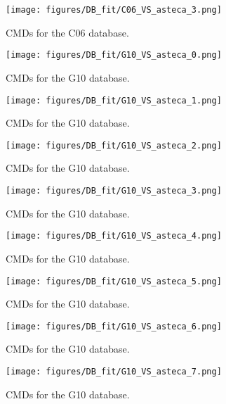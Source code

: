 \documentclass{aa}
\begin{document}
\begin{appendix}
\begin{figure}
\texttt{[image: figures/DB\_fit/C06\_VS\_asteca\_3.png]}
\caption{CMDs for the C06 database.}
\label{fig:DBs_C06_3}
\end{figure}
\clearpage

\begin{figure*}
\texttt{[image: figures/DB\_fit/G10\_VS\_asteca\_0.png]}
\caption{CMDs for the G10 database.}
\label{fig:DBs_G10_0}
\end{figure*}
\clearpage

\begin{figure*}
\texttt{[image: figures/DB\_fit/G10\_VS\_asteca\_1.png]}
\caption{CMDs for the G10 database.}
\label{fig:DBs_G10_1}
\end{figure*}
\clearpage

\begin{figure*}
\texttt{[image: figures/DB\_fit/G10\_VS\_asteca\_2.png]}
\caption{CMDs for the G10 database.}
\label{fig:DBs_G10_2}
\end{figure*}
\clearpage

\begin{figure*}
\texttt{[image: figures/DB\_fit/G10\_VS\_asteca\_3.png]}
\caption{CMDs for the G10 database.}
\label{fig:DBs_G10_3}
\end{figure*}
\clearpage

\begin{figure*}
\texttt{[image: figures/DB\_fit/G10\_VS\_asteca\_4.png]}
\caption{CMDs for the G10 database.}
\label{fig:DBs_G10_4}
\end{figure*}
\clearpage

\begin{figure*}
\texttt{[image: figures/DB\_fit/G10\_VS\_asteca\_5.png]}
\caption{CMDs for the G10 database.}
\label{fig:DBs_G10_5}
\end{figure*}
\clearpage

\begin{figure*}
\texttt{[image: figures/DB\_fit/G10\_VS\_asteca\_6.png]}
\caption{CMDs for the G10 database.}
\label{fig:DBs_G10_6}
\end{figure*}
\clearpage

\begin{figure*}
\texttt{[image: figures/DB\_fit/G10\_VS\_asteca\_7.png]}
\caption{CMDs for the G10 database.}
\label{fig:DBs_G10_7}
\end{figure*}
\clearpage


\end{appendix}
\end{document}
